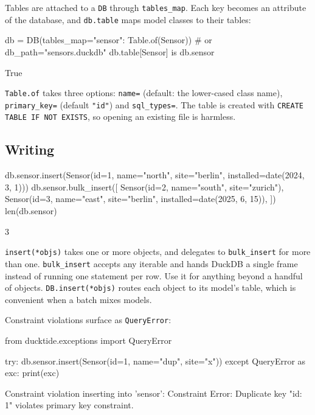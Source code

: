 \documentclass[11pt,a4paper]{article}
\newcommand{\code}[1]{\texttt{#1}}
\begin{document}
Tables are attached to a \code{DB} through \code{tables\_map}. Each key becomes an
attribute of the database, and \code{db.table} maps model classes to their tables:

\begin{python}
db = DB(tables_map={"sensor": Table.of(Sensor)})      # or db_path="sensors.duckdb"
db.table[Sensor] is db.sensor
\end{python}
\begin{console}
True
\end{console}

\code{Table.of} takes three options: \code{name=} (default: the lower-cased class name),
\code{primary\_key=} (default \code{"id"}) and \code{sql\_types=}. The table is created with
\code{CREATE TABLE IF NOT EXISTS}, so opening an existing file is harmless.

\subsection{Writing}

\begin{python}
db.sensor.insert(Sensor(id=1, name="north", site="berlin", installed=date(2024, 3, 1)))
db.sensor.bulk_insert([
    Sensor(id=2, name="south", site="zurich"),
    Sensor(id=3, name="east", site="berlin", installed=date(2025, 6, 15)),
])
len(db.sensor)
\end{python}
\begin{console}
3
\end{console}

\code{insert(*objs)} takes one or more objects, and delegates to \code{bulk\_insert} for
more than one. \code{bulk\_insert} accepts any iterable and hands DuckDB a single frame
instead of running one statement per row. Use it for anything beyond a handful of objects.
\code{DB.insert(*objs)} routes each object to its model's table, which is convenient when a
batch mixes models.

Constraint violations surface as \code{QueryError}:

\begin{python}
from ducktide.exceptions import QueryError

try:
    db.sensor.insert(Sensor(id=1, name="dup", site="x"))
except QueryError as exc:
    print(exc)
\end{python}
\begin{console}
Constraint violation inserting into 'sensor': Constraint Error: Duplicate key "id: 1"
violates primary key constraint.
\end{console}
\end{document}
